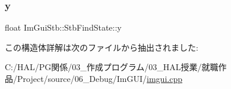 \subsubsection{\texorpdfstring{y}{y}}
{\footnotesize\ttfamily float Im\+Gui\+Stb\+::\+Stb\+Find\+State\+::y}



この構造体詳解は次のファイルから抽出されました\+:\begin{DoxyCompactItemize}
\item 
C\+:/\+H\+A\+L/\+P\+G関係/03\+\_\+作成プログラム/03\+\_\+\+H\+A\+L授業/就職作品/\+Project/source/06\+\_\+\+Debug/\+Im\+G\+U\+I/\mbox{\hyperlink{imgui_8cpp}{imgui.\+cpp}}\end{DoxyCompactItemize}
